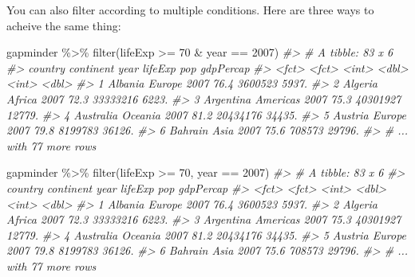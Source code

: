 \documentclass[
]{book}
\newenvironment{Shaded}{\begin{snugshade}}{\end{snugshade}}
\newcommand{\CommentTok}[1]{\textcolor[rgb]{0.56,0.35,0.01}{\textit{#1}}}
\newcommand{\DecValTok}[1]{\textcolor[rgb]{0.00,0.00,0.81}{#1}}
\newcommand{\FunctionTok}[1]{\textcolor[rgb]{0.00,0.00,0.00}{#1}}
\newcommand{\NormalTok}[1]{#1}
\newcommand{\SpecialCharTok}[1]{\textcolor[rgb]{0.00,0.00,0.00}{#1}}
\begin{document}
You can also filter according to multiple conditions. Here are three ways to acheive the same thing:

\begin{Shaded}
\begin{Highlighting}[]
\NormalTok{gapminder }\SpecialCharTok{\%\textgreater{}\%} \FunctionTok{filter}\NormalTok{(lifeExp }\SpecialCharTok{\textgreater{}=} \DecValTok{70} \SpecialCharTok{\&}\NormalTok{ year }\SpecialCharTok{==} \DecValTok{2007}\NormalTok{)}
\CommentTok{\#\textgreater{} \# A tibble: 83 x 6}
\CommentTok{\#\textgreater{}   country   continent  year lifeExp      pop gdpPercap}
\CommentTok{\#\textgreater{}   \textless{}fct\textgreater{}     \textless{}fct\textgreater{}     \textless{}int\textgreater{}   \textless{}dbl\textgreater{}    \textless{}int\textgreater{}     \textless{}dbl\textgreater{}}
\CommentTok{\#\textgreater{} 1 Albania   Europe     2007    76.4  3600523     5937.}
\CommentTok{\#\textgreater{} 2 Algeria   Africa     2007    72.3 33333216     6223.}
\CommentTok{\#\textgreater{} 3 Argentina Americas   2007    75.3 40301927    12779.}
\CommentTok{\#\textgreater{} 4 Australia Oceania    2007    81.2 20434176    34435.}
\CommentTok{\#\textgreater{} 5 Austria   Europe     2007    79.8  8199783    36126.}
\CommentTok{\#\textgreater{} 6 Bahrain   Asia       2007    75.6   708573    29796.}
\CommentTok{\#\textgreater{} \# ... with 77 more rows}
\end{Highlighting}
\end{Shaded}

\begin{Shaded}
\begin{Highlighting}[]
\NormalTok{gapminder }\SpecialCharTok{\%\textgreater{}\%} \FunctionTok{filter}\NormalTok{(lifeExp }\SpecialCharTok{\textgreater{}=} \DecValTok{70}\NormalTok{, year }\SpecialCharTok{==} \DecValTok{2007}\NormalTok{)}
\CommentTok{\#\textgreater{} \# A tibble: 83 x 6}
\CommentTok{\#\textgreater{}   country   continent  year lifeExp      pop gdpPercap}
\CommentTok{\#\textgreater{}   \textless{}fct\textgreater{}     \textless{}fct\textgreater{}     \textless{}int\textgreater{}   \textless{}dbl\textgreater{}    \textless{}int\textgreater{}     \textless{}dbl\textgreater{}}
\CommentTok{\#\textgreater{} 1 Albania   Europe     2007    76.4  3600523     5937.}
\CommentTok{\#\textgreater{} 2 Algeria   Africa     2007    72.3 33333216     6223.}
\CommentTok{\#\textgreater{} 3 Argentina Americas   2007    75.3 40301927    12779.}
\CommentTok{\#\textgreater{} 4 Australia Oceania    2007    81.2 20434176    34435.}
\CommentTok{\#\textgreater{} 5 Austria   Europe     2007    79.8  8199783    36126.}
\CommentTok{\#\textgreater{} 6 Bahrain   Asia       2007    75.6   708573    29796.}
\CommentTok{\#\textgreater{} \# ... with 77 more rows}
\end{Highlighting}
\end{Shaded}
\end{document}
